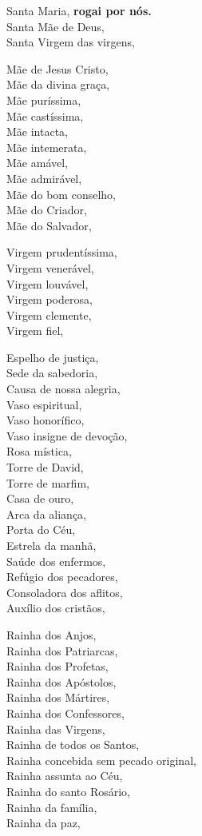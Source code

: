 \documentclass{rosario}
\begin{document}
\begin{multicols}{2}
Santa Maria, \textbf{rogai por nós.} \\
Santa Mãe de Deus, \\
Santa Virgem das virgens,

Mãe de Jesus Cristo, \\
Mãe da divina graça, \\
Mãe puríssima, \\
Mãe castíssima, \\
Mãe intacta, \\
Mãe intemerata, \\
Mãe amável, \\
Mãe admirável, \\
Mãe do bom conselho, \\
Mãe do Criador, \\
Mãe do Salvador,

Virgem prudentíssima, \\
Virgem venerável, \\
Virgem louvável, \\
Virgem poderosa, \\
Virgem clemente, \\
Virgem fiel,

Espelho de justiça, \\
Sede da sabedoria, \\
Causa de nossa alegria, \\
Vaso espiritual, \\
Vaso honorífico, \\
Vaso insigne de devoção, \\
Rosa mística, \\
Torre de David, \\
Torre de marfim, \\
Casa de ouro, \\
Arca da aliança, \\
Porta do Céu, \\
Estrela da manhã, \\
Saúde dos enfermos, \\
Refúgio dos pecadores, \\
Consoladora dos aflitos, \\
Auxílio dos cristãos,

Rainha dos Anjos, \\
Rainha dos Patriarcas, \\
Rainha dos Profetas, \\
Rainha dos Apóstolos, \\
Rainha dos Mártires, \\
Rainha dos Confessores, \\
Rainha das Virgens, \\
Rainha de todos os Santos, \\
Rainha concebida sem pecado original, \\
Rainha assunta ao Céu, \\
Rainha do santo Rosário, \\
Rainha da família, \\
Rainha da paz,
\end{multicols}
\end{document}
